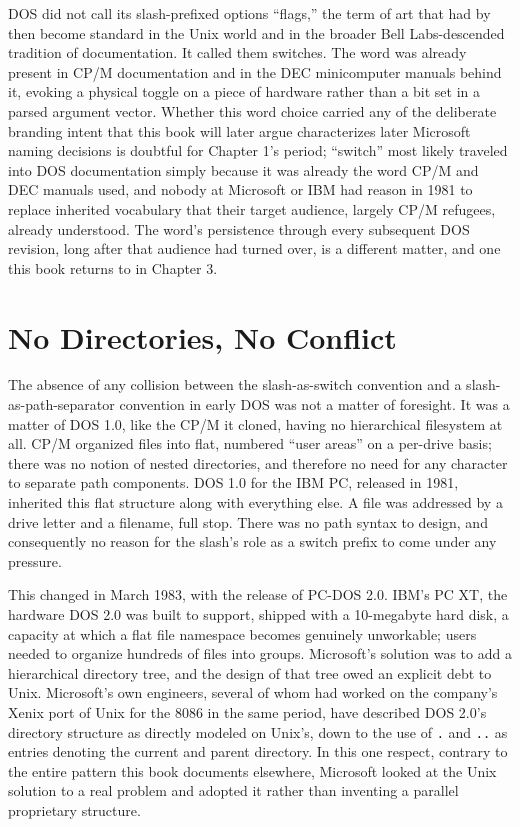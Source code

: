 \documentclass[11pt]{book}
\begin{document}
DOS did not call its slash-prefixed options ``flags,'' the term of art that had by then become standard in the Unix world and in the broader Bell Labs-descended tradition of documentation. It called them switches. The word was already present in CP/M documentation and in the DEC minicomputer manuals behind it, evoking a physical toggle on a piece of hardware rather than a bit set in a parsed argument vector. Whether this word choice carried any of the deliberate branding intent that this book will later argue characterizes later Microsoft naming decisions is doubtful for Chapter 1's period; ``switch'' most likely traveled into DOS documentation simply because it was already the word CP/M and DEC manuals used, and nobody at Microsoft or IBM had reason in 1981 to replace inherited vocabulary that their target audience, largely CP/M refugees, already understood. The word's persistence through every subsequent DOS revision, long after that audience had turned over, is a different matter, and one this book returns to in Chapter 3.

\section{No Directories, No Conflict}

The absence of any collision between the slash-as-switch convention and a slash-as-path-separator convention in early DOS was not a matter of foresight. It was a matter of DOS 1.0, like the CP/M it cloned, having no hierarchical filesystem at all. CP/M organized files into flat, numbered ``user areas'' on a per-drive basis; there was no notion of nested directories, and therefore no need for any character to separate path components. DOS 1.0 for the IBM PC, released in 1981, inherited this flat structure along with everything else. A file was addressed by a drive letter and a filename, full stop. There was no path syntax to design, and consequently no reason for the slash's role as a switch prefix to come under any pressure.

This changed in March 1983, with the release of PC-DOS 2.0. IBM's PC XT, the hardware DOS 2.0 was built to support, shipped with a 10-megabyte hard disk, a capacity at which a flat file namespace becomes genuinely unworkable; users needed to organize hundreds of files into groups. Microsoft's solution was to add a hierarchical directory tree, and the design of that tree owed an explicit debt to Unix. Microsoft's own engineers, several of whom had worked on the company's Xenix port of Unix for the 8086 in the same period, have described DOS 2.0's directory structure as directly modeled on Unix's, down to the use of \texttt{.} and \texttt{..} as entries denoting the current and parent directory. In this one respect, contrary to the entire pattern this book documents elsewhere, Microsoft looked at the Unix solution to a real problem and adopted it rather than inventing a parallel proprietary structure.
\end{document}
